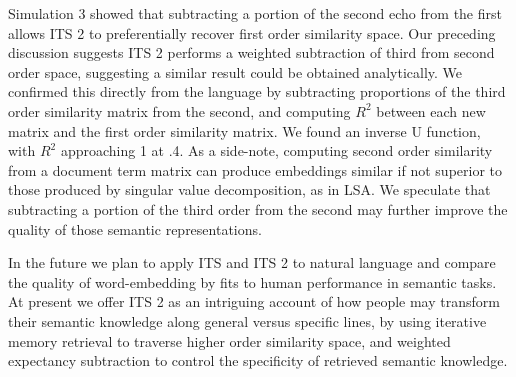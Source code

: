 \documentclass[10pt,letterpaper]{article}
\begin{document}
Simulation 3 showed that subtracting a portion of the second echo from the first allows ITS 2 to preferentially recover first order similarity space. Our preceding discussion suggests ITS 2 performs a weighted subtraction of third from second order space, suggesting a similar result could be obtained analytically. We confirmed this directly from the language by subtracting proportions of the third order similarity matrix from the second, and computing \(R^2\) between each new matrix and the first order similarity matrix. We found an inverse U function, with \(R^2\) approaching 1 at .4. As a side-note, computing second order similarity from a document term matrix  \cite{cribbinDiscoveringLatentTopical2011} can produce embeddings similar if not superior to those produced by singular value decomposition, as in LSA. We speculate that subtracting a portion of the third order from the second may further improve the quality of those semantic representations.

In the future we plan to apply ITS and ITS 2 to natural language and compare the quality of word-embedding by fits to human performance in semantic tasks. At present we offer ITS 2 as an intriguing account of how people may transform their semantic knowledge along general versus specific lines, by using iterative memory retrieval to traverse higher order similarity space, and weighted expectancy subtraction to control the specificity of retrieved semantic knowledge.
\end{document}
